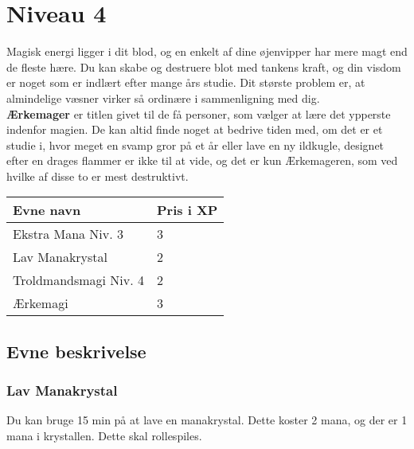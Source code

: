 \chapter{Niveau 4}
Magisk energi ligger i dit blod, og en enkelt af dine øjenvipper har mere magt end de fleste hære. Du kan skabe og destruere blot med tankens kraft, og din visdom er noget som er indlært efter mange års studie. Dit største problem er, at almindelige væsner virker så ordinære i sammenligning med dig.\\
\textbf{Ærkemager} er titlen givet til de få personer, som vælger at lære det ypperste indenfor magien. De kan altid finde noget at bedrive tiden med, om det er et studie i, hvor meget en svamp gror på et år eller lave en ny ildkugle, designet efter en drages flammer er ikke til at vide, og det er kun Ærkemageren, som ved hvilke af disse to er mest destruktivt.\\

\begin{table}[H]
    \centering
    \begin{tabular}{|p{}|p{}|}
    \rowcolor{cerulean!80}\hline
        Evne navn & Pris i XP \\\hline
        Ekstra Mana Niv. 3 & 3\\\hline
        Lav Manakrystal & 2\\\hline 
        Troldmandsmagi Niv. 4 & 2\\\hline
        Ærkemagi & 3\\\hline
    \end{tabular}
\end{table}
\section*{Evne beskrivelse}



\subsection{Lav Manakrystal}
Du kan bruge 15 min på at lave en manakrystal. Dette koster 2 mana, og der er 1 mana i krystallen. Dette skal rollespiles. 


